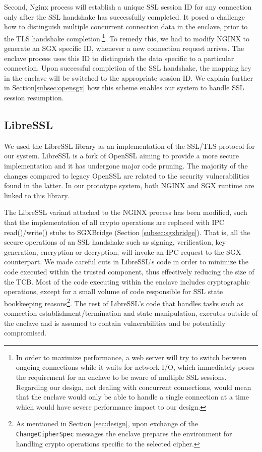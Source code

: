 \documentclass[../main.tex]{subfiles}
\begin{document}
Second, Nginx process will establish a unique SSL session ID for any 
connection only after the SSL handshake has successfully completed. It posed a 
challenge how to distinguish multiple concurrent connection data in the enclave,
prior to the TLS handshake completion.\footnote{In order to maximize
performance, a web server will try to switch between ongoing connections while
it waits for network I/O, which immediately poses the requirement for an
enclave to be aware of multiple SSL sessions. Regarding our design, not dealing
with concurrent connections, would mean that the enclave would only be able to
handle a single connection at a time which would have severe performance impact
to our design.}. To remedy this, we had to modify NGINX to generate an SGX specific ID, 
whenever a new connection request arrives. The enclave process uses this ID to distinguish
the data specific to a particular connection. Upon successful completion of the SSL handshake, the 
mapping key in the enclave will be switched to the appropriate session ID. We explain 
further in Section\ref{subsec:opensgx} how this scheme enables our system to handle 
SSL session resumption.

\subsection{LibreSSL}
\label{subsec:libressl}
We used the LibreSSL library as an implementation of the SSL/TLS protocol for
our system. LibreSSL is a fork of OpenSSL aiming to provide a more secure
implementation and it has undergone major code pruning. The majority of the
changes compared to legacy OpenSSL are related to the security vulnerabilities
found in the latter. In our prototype system, both NGINX and SGX runtime are
linked to this library.

The LibreSSL variant attached to the NGINX process has been modified, such that
the implementation of all crypto operations are replaced with IPC
read()/write() stubs to SGXBridge (Section \ref{subsec:sgxbridge}). That is,
all the secure operations of an SSL handshake such as signing, verification,
key generation, encryption or decryption, will invoke an IPC request to the SGX
counterpart. We made careful cuts in LibreSSL's code in order to minimize the
code executed within the trusted component, thus effectively reducing the size
of the TCB. Most of the code executing within the enclave includes
cryptographic operations, except for a small volume of code responsible for
SSL state bookkeeping reasons\footnote{As mentioned in Section
\ref{sec:design}, upon exchange of the \texttt{ChangeCipherSpec} messages the
enclave prepares the environment for handling crypto operations specific to
the selected cipher.}. The rest of LibreSSL's code that handles tasks such as
connection establishment/termination and state manipulation, executes outside
of the enclave and is assumed to contain vulnerabilities and be potentially
compromised.
\end{document}
